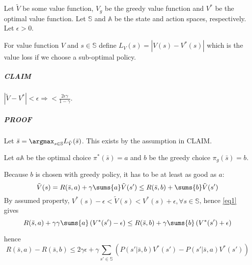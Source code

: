 \section{}\label{question3}

Let $\tilde{V}$ be some value function, $V_g$ be the greedy value function and $V^*$ be the optimal value function. Let $\mathbb{S}$ and $\mathbb{A}$ be the state and action spaces, respectively. Let $\epsilon>0$.

For value function $V$ and $s\in \mathbb{S}$ define $L_V(s) = |V(s) - V^*(s)|$ which is the value loss if we choose a sub-optimal policy.

\subparagraph{CLAIM} $|\tilde{V} - V^*|<\epsilon \Rightarrow <\frac{2\epsilon \gamma}{1-\gamma}$.

\subparagraph{PROOF}

Let $\bar{s} = \argmax_{s\in\mathbb{S}} L_{\tilde{V}}(\bar{s})$. This exists by the assumption in CLAIM.

Let $a\mathbb{A}$ be the optimal choice $\pi^*(\bar{s}) = a$ and $b$ be the greedy choice $\pi_g(\bar{s})=b$.

Because $b$ is chosen with greedy policy, it has to be at least as good as $a$:
\begin{equation}
\tilde{V}(s) = R(\bar{s},a)+\gamma \sums{a} \tilde{V} (s') \leq R(\bar{s},b) + \sums{b} \tilde{V}(s')
\label{eq1}
\end{equation}
By assumed property, $ V^*(s) - \epsilon< \tilde{V}(s) <V^*(s) + \epsilon, \forall s\in\mathbb{S}$, hence \eqref{eq1} gives
\begin{equation*}
R(\bar{s},a)+\gamma \gamma \sums{a} \left(V^* (s')-\epsilon\right) \leq R(\bar{s},b) + \gamma \sums{b} \left(V^*(s')+\epsilon \right)
\label{eq2}
\end{equation*}

hence
\begin{equation}
R(\bar{s},a)-R(\bar{s},b) \leq 2\gamma \epsilon + \gamma \sum_{s'\in\mathbb{S}}\left( P(s' | \bar{s},b) V^*(s') - P(s' | \bar{s}, a) V^*(s')\right)
\label{eq3}
\end{equation}


